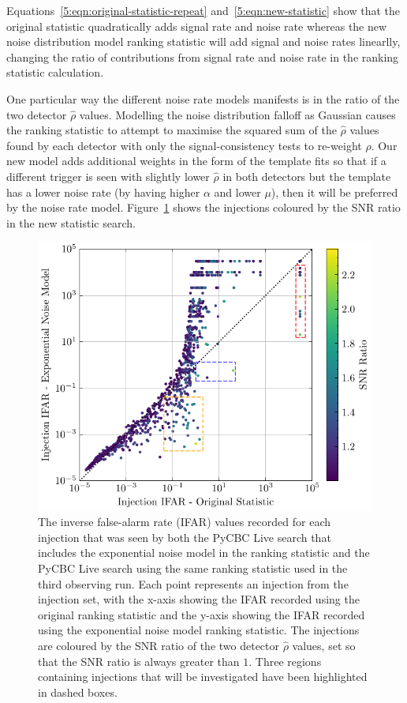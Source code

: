 Equations~\ref{5:eqn:original-statistic-repeat} and~\ref{5:eqn:new-statistic} show that the original statistic quadratically adds signal rate and noise rate whereas the new noise distribution model ranking statistic will add signal and noise rates linearlly, changing the ratio of contributions from signal rate and noise rate in the ranking statistic calculation.

One particular way the different noise rate models manifests is in the ratio of the two detector $\hat{\rho}$ values. Modelling the noise distribution falloff as Gaussian causes the ranking statistic to attempt to maximise the squared sum of the $\hat{\rho}$ values found by each detector with only the signal-consistency tests to re-weight $\rho$. Our new model adds additional weights in the form of the template fits so that if a different trigger is seen with slightly lower $\hat{\rho}$ in both detectors but the template has a lower noise rate (by having higher $\alpha$ and lower $\mu$), then it will be preferred by the noise rate model. Figure~\ref{5:fig:ifar-ifar-snr-ratio} shows the injections coloured by the SNR ratio in the new statistic search.
%
\begin{figure}
  \centering
  \begin{minipage}[t]{1.0\linewidth}
    \includegraphics[width=1\textwidth]{images/5_pycbclive/regions/fits_only_ifar_vs_ifar_regions_snr_ratio.pdf}
  \end{minipage}
  \caption{The inverse false-alarm rate (IFAR) values recorded for each injection that was seen by both the PyCBC Live search that includes the exponential noise model in the ranking statistic and the PyCBC Live search using the same ranking statistic used in the third observing run. Each point represents an injection from the injection set, with the x-axis showing the IFAR recorded using the original ranking statistic and the y-axis showing the IFAR recorded using the exponential noise model ranking statistic. The injections are coloured by the SNR ratio of the two detector $\hat{\rho}$ values, set so that the SNR ratio is always greater than $1$. Three regions containing injections that will be investigated have been highlighted in dashed boxes.}
  \label{5:fig:ifar-ifar-snr-ratio}
\end{figure}
